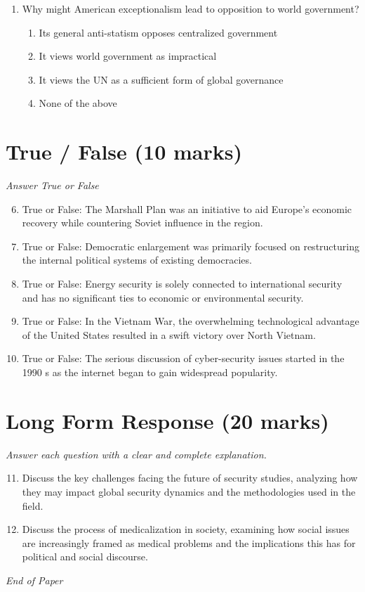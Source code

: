 \documentclass[12pt]{article}
\begin{document}
\begin{enumerate}[label=\arabic*.]
\begin{enumerate}[label=(\alph*)]
\end{enumerate}
\item Why might American exceptionalism lead to opposition to world government?
\begin{enumerate}[label=(\alph*)]
    \item Its general anti-statism opposes centralized government
    \item It views world government as impractical
    \item It views the UN as a sufficient form of global governance
    \item None of the above
\end{enumerate}
\end{enumerate}

\section*{True / False (10 marks)}
\textit{Answer True or False}
\begin{enumerate}[label=\arabic*.]
\setcounter{enumi}{5}
\item True or False: The Marshall Plan was an initiative to aid Europe's economic recovery while countering Soviet influence in the region.
\item True or False: Democratic enlargement was primarily focused on restructuring the internal political systems of existing democracies.
\item True or False: Energy security is solely connected to international security and has no significant ties to economic or environmental security.
\item True or False: In the Vietnam War, the overwhelming technological advantage of the United States resulted in a swift victory over North Vietnam.
\item True or False: The serious discussion of cyber-security issues started in the 1990 s as the internet began to gain widespread popularity.
\end{enumerate}

\section*{Long Form Response (20 marks)}
\textit{Answer each question with a clear and complete explanation.}
\begin{enumerate}[label=\arabic*.]
\setcounter{enumi}{10}
\item Discuss the key challenges facing the future of security studies, analyzing how they may impact global security dynamics and the methodologies used in the field.
\item Discuss the process of medicalization in society, examining how social issues are increasingly framed as medical problems and the implications this has for political and social discourse.
\end{enumerate}

\vfill
\noindent\textit{End of Paper}
\end{document}
